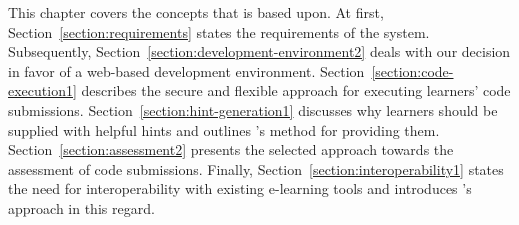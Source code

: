 This chapter covers the concepts that \tool is based upon. At first, Section~\ref{section:requirements} states the requirements of the system. Subsequently, Section~\ref{section:development-environment2} deals with our decision in favor of a web-based development environment. Section~\ref{section:code-execution1} describes the secure and flexible approach for executing learners' code submissions. Section~\ref{section:hint-generation1} discusses why learners should be supplied with helpful hints and outlines \tool's method for providing them. Section~\ref{section:assessment2} presents the selected approach towards the assessment of code submissions. Finally, Section~\ref{section:interoperability1} states the need for interoperability with existing e-learning tools and introduces \tool's approach in this regard.
